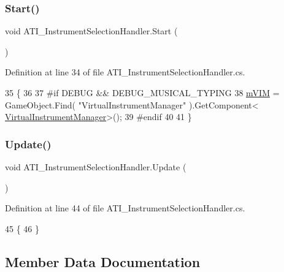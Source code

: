 \subsubsection{\texorpdfstring{Start()}{Start()}}
{\footnotesize\ttfamily void A\+T\+I\+\_\+\+Instrument\+Selection\+Handler.\+Start (\begin{DoxyParamCaption}{ }\end{DoxyParamCaption})\hspace{0.3cm}{\ttfamily [private]}}



Definition at line 34 of file A\+T\+I\+\_\+\+Instrument\+Selection\+Handler.\+cs.


\begin{DoxyCode}
35     \{
36 
37 \textcolor{preprocessor}{#if DEBUG && DEBUG\_MUSICAL\_TYPING}
38         \hyperlink{class_a_t_i___instrument_selection_handler_a744213ecae613372020009bc5c9688c8}{mVIM} = GameObject.Find( \textcolor{stringliteral}{"VirtualInstrumentManager"} ).GetComponent<
      \hyperlink{class_virtual_instrument_manager}{VirtualInstrumentManager}>();
39 \textcolor{preprocessor}{#endif}
40 
41     \}
\end{DoxyCode}
\mbox{\label{class_a_t_i___instrument_selection_handler_a725510a41c1f4665e3874029486aab99}} 
\subsubsection{\texorpdfstring{Update()}{Update()}}
{\footnotesize\ttfamily void A\+T\+I\+\_\+\+Instrument\+Selection\+Handler.\+Update (\begin{DoxyParamCaption}{ }\end{DoxyParamCaption})\hspace{0.3cm}{\ttfamily [private]}}



Definition at line 44 of file A\+T\+I\+\_\+\+Instrument\+Selection\+Handler.\+cs.


\begin{DoxyCode}
45     \{
46     \}
\end{DoxyCode}


\subsection{Member Data Documentation}
\mbox{\label{class_a_t_i___instrument_selection_handler_a744213ecae613372020009bc5c9688c8}} 
